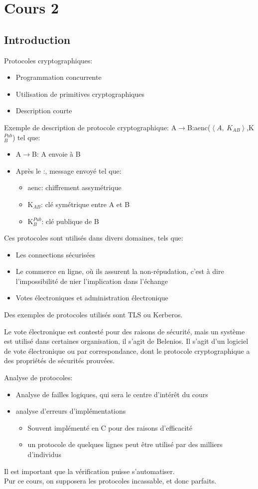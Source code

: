 \section{Cours 2}
\subsection{Introduction}
Protocoles cryptographiques:
\begin{itemize}
	\item Programmation concurrente
	\item Utilisation de primitives cryptographiques
	\item Description courte
\end{itemize}
Exemple de description de protocole cryptographique: A$\rightarrow$B:aenc($\left< A,~K_{AB}\right>$,K$_B^{Pub}$) tel que:
\begin{itemize}
	\item A$\rightarrow$B: A envoie à B
	\item Après le :, message envoyé tel que:
	\begin{itemize}
		\item aenc: chiffrement assymétrique
		\item K$_{AB}$: clé symétrique entre A et B
		\item K$_B^{Pub}$: clé publique de B
	\end{itemize}
\end{itemize}

Ces protocoles sont utilisés dans divers domaines, tels que:
\begin{itemize}
	\item Les connections sécurisées
	\item Le commerce en ligne, où ils assurent la non-répudation, c'est à dire l'impossibilité de nier
	l'implication dans l'échange
	\item Votes électroniques et administration électronique
\end{itemize}
Des exemples de protocoles utilisés sont TLS ou Kerberos.

Le vote électronique est contesté pour des raisons de sécurité, mais un système est utilisé dans certaines
organisation, il s'agit de Belenios. Il s'agit d'un logiciel de vote électronique ou par correspondance, dont le
protocole cryptographique a des propriétés de sécurités prouvées.

Analyse de protocoles:
\begin{itemize}
	\item Analyse de failles logiques, qui sera le centre d'intérêt du cours
	\item analyse d'erreurs d'implémentations
	\begin{itemize}
		\item Souvent implémenté en C pour des raisons d'efficacité
		\item un protocole de quelques lignes peut être utilisé par des milliers d'individus
	\end{itemize}
\end{itemize}
Il est important que la vérification puisse s'automatiser.\\
Pur ce cours, on supposera les protocoles incassable, et donc parfaits.

